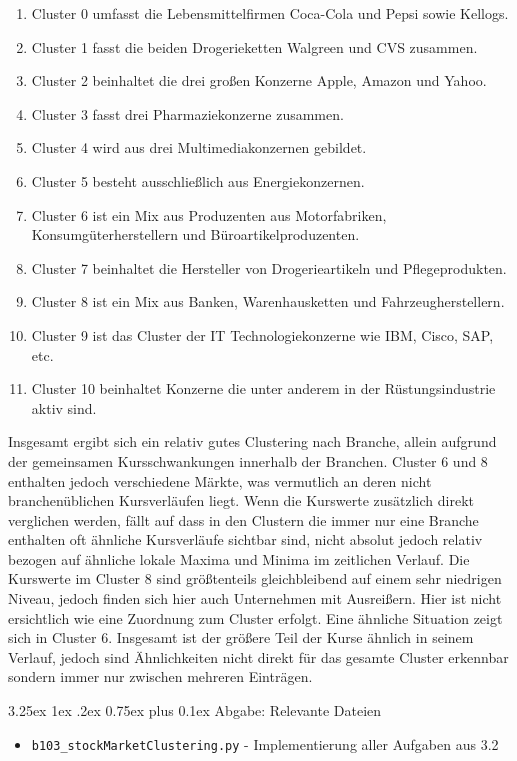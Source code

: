 \documentclass[12pt,a4paper]{scrartcl}
\makeatletter
\renewcommand\subparagraph{\@startsection{subparagraph}{5}{\parindent}%
    {3.25ex \@plus1ex \@minus .2ex}%
    {0.75ex plus 0.1ex}%
    {\normalfont\normalsize\bfseries}}
\makeatother
\begin{document}
\begin{enumerate}
\item Cluster 0 umfasst die Lebensmittelfirmen Coca-Cola und Pepsi sowie Kellogs.
\item Cluster 1 fasst die beiden Drogerieketten Walgreen und CVS zusammen. 
\item Cluster 2 beinhaltet die drei großen Konzerne Apple, Amazon und Yahoo.
\item Cluster 3 fasst drei Pharmaziekonzerne zusammen. 
\item Cluster 4 wird aus drei Multimediakonzernen gebildet.
\item Cluster 5 besteht ausschließlich aus Energiekonzernen.
\item Cluster 6 ist ein Mix aus Produzenten aus Motorfabriken, Konsumgüterherstellern und Büroartikelproduzenten.
\item Cluster 7 beinhaltet die Hersteller von Drogerieartikeln und Pflegeprodukten.
\item Cluster 8 ist ein Mix aus Banken, Warenhausketten und Fahrzeugherstellern.
\item Cluster 9 ist das Cluster der IT Technologiekonzerne wie IBM, Cisco, SAP, etc.
\item Cluster 10 beinhaltet Konzerne die unter anderem in der Rüstungsindustrie aktiv sind.
\end{enumerate}

Insgesamt ergibt sich ein relativ gutes Clustering nach Branche, allein aufgrund
der gemeinsamen Kursschwankungen innerhalb der Branchen. Cluster 6 und 8 enthalten jedoch
verschiedene Märkte, was vermutlich an deren nicht branchenüblichen Kursverläufen liegt. 
Wenn die Kurswerte zusätzlich direkt verglichen werden, fällt auf dass in den Clustern die immer
nur eine Branche enthalten oft ähnliche Kursverläufe sichtbar sind, nicht absolut jedoch relativ
bezogen auf ähnliche lokale Maxima und Minima im zeitlichen Verlauf. 
Die Kurswerte im Cluster 8 sind größtenteils gleichbleibend auf einem sehr niedrigen Niveau,
jedoch finden sich hier auch Unternehmen mit Ausreißern. Hier ist nicht ersichtlich wie eine
Zuordnung zum Cluster erfolgt.
Eine ähnliche Situation zeigt sich in Cluster 6. Insgesamt ist der größere Teil der Kurse
ähnlich in seinem Verlauf, jedoch sind Ähnlichkeiten nicht direkt für das gesamte Cluster
erkennbar sondern immer nur zwischen mehreren Einträgen.

\subparagraph{Abgabe: Relevante Dateien}
\begin{itemize}
\item \lstinline{b103_stockMarketClustering.py} - Implementierung aller Aufgaben aus 3.2
\end{itemize}
\end{document}
